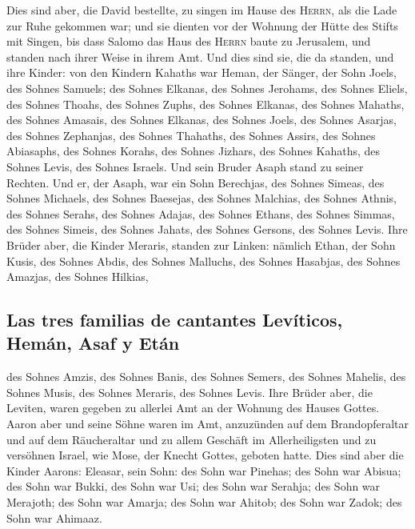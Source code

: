  Dies sind aber, die David bestellte, zu singen im Hause
des \textsc{Herrn}, als die Lade zur Ruhe gekommen war; 
und sie dienten vor der Wohnung der Hütte des Stifts mit Singen, bis
dass Salomo das Haus des \textsc{Herrn} baute zu Jerusalem, und standen
nach ihrer Weise in ihrem Amt.  Und dies sind sie, die da
standen, und ihre Kinder: von den Kindern Kahaths war Heman, der Sänger,
der Sohn Joels, des Sohnes Samuels;  des Sohnes Elkanas,
des Sohnes Jerohams, des Sohnes Eliels, des Sohnes Thoahs,
 des Sohnes Zuphs, des Sohnes Elkanas, des Sohnes
Mahaths, des Sohnes Amasais,  des Sohnes Elkanas, des
Sohnes Joels, des Sohnes Asarjas, des Sohnes Zephanjas, 
des Sohnes Thahaths, des Sohnes Assirs, des Sohnes Abiasaphs, des Sohnes
Korahs,  des Sohnes Jizhars, des Sohnes Kahaths, des
Sohnes Levis, des Sohnes Israels.  Und sein Bruder Asaph
stand zu seiner Rechten. Und er, der Asaph, war ein Sohn Berechjas, des
Sohnes Simeas,  des Sohnes Michaels, des Sohnes Baesejas,
des Sohnes Malchias,  des Sohnes Athnis, des Sohnes
Serahs, des Sohnes Adajas,  des Sohnes Ethans, des Sohnes
Simmas, des Sohnes Simeis,  des Sohnes Jahats, des Sohnes
Gersons, des Sohnes Levis.  Ihre Brüder aber, die Kinder
Meraris, standen zur Linken: nämlich Ethan, der Sohn Kusis, des Sohnes
Abdis, des Sohnes Malluchs,  des Sohnes Hasabjas, des
Sohnes Amazjas, des Sohnes Hilkias,

\hypertarget{las-tres-familias-de-cantantes-levuxedticos-hemuxe1n-asaf-y-etuxe1n}{%
\subsection{Las tres familias de cantantes Levíticos, Hemán, Asaf y
Etán}\label{las-tres-familias-de-cantantes-levuxedticos-hemuxe1n-asaf-y-etuxe1n}}

 des Sohnes Amzis, des Sohnes Banis, des Sohnes Semers,
 des Sohnes Mahelis, des Sohnes Musis, des Sohnes
Meraris, des Sohnes Levis.  Ihre Brüder aber, die
Leviten, waren gegeben zu allerlei Amt an der Wohnung des Hauses Gottes.
 Aaron aber und seine Söhne waren im Amt, anzuzünden auf
dem Brandopferaltar und auf dem Räucheraltar und zu allem Geschäft im
Allerheiligsten und zu versöhnen Israel, wie Mose, der Knecht Gottes,
geboten hatte.  Dies sind aber die Kinder Aarons:
Eleasar, sein Sohn: des Sohn war Pinehas; des Sohn war Abisua;
 des Sohn war Bukki, des Sohn war Usi; des Sohn war
Serahja;  des Sohn war Merajoth; des Sohn war Amarja; des
Sohn war Ahitob;  des Sohn war Zadok; des Sohn war
Ahimaaz.

